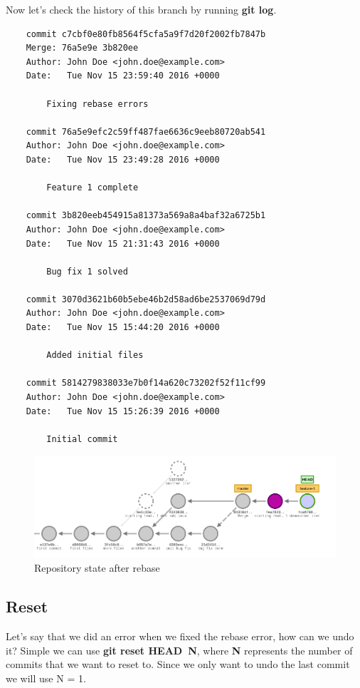 \documentclass{article}
\begin{document}
Now let's check the history of this branch by running \textbf{git log}.

\begin{lstlisting}
	commit c7cbf0e80fb8564f5cfa5a9f7d20f2002fb7847b
	Merge: 76a5e9e 3b820ee
	Author: John Doe <john.doe@example.com>
	Date:   Tue Nov 15 23:59:40 2016 +0000

    	Fixing rebase errors

	commit 76a5e9efc2c59ff487fae6636c9eeb80720ab541
	Author: John Doe <john.doe@example.com>
	Date:   Tue Nov 15 23:49:28 2016 +0000

    	Feature 1 complete

	commit 3b820eeb454915a81373a569a8a4baf32a6725b1
	Author: John Doe <john.doe@example.com>
	Date:   Tue Nov 15 21:31:43 2016 +0000

    	Bug fix 1 solved

	commit 3070d3621b60b5ebe46b2d58ad6be2537069d79d
	Author: John Doe <john.doe@example.com>
	Date:   Tue Nov 15 15:44:20 2016 +0000

    	Added initial files

	commit 5814279838033e7b0f14a620c73202f52f11cf99
	Author: John Doe <john.doe@example.com>
	Date:   Tue Nov 15 15:26:39 2016 +0000

    	Initial commit
\end{lstlisting}

\begin{figure}[H]
\centerline{\includegraphics[scale=0.5]{repository_after_rebase.png}}
\caption{Repository state after rebase}
\label{fig1}
\end{figure}

\subsection{Reset}

Let's say that we did an error when we fixed the rebase error, how can we undo it? Simple we can use \textbf{git reset HEAD~N}, where \textbf{N} represents the number of commits that we want to reset to. Since we only want to undo the last commit we will use N = 1.
\end{document}
